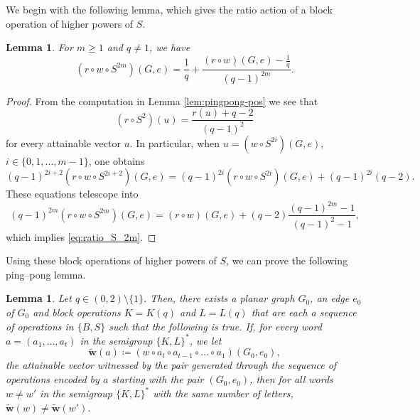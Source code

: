 \documentclass[A4paper,reqno,oneside,12pt]{amsart}
\theoremstyle{plain}
\newtheorem{lemma}[theorem]{Lemma}
\theoremstyle{definition}
\begin{document}
We begin with the following lemma, which gives the ratio action of a block operation of higher powers of $S$.
\begin{lemma}
    \label{lem:S2_powers}
    For $m \geq 1$ and $q \neq 1$, we have 
    \begin{equation}\label{eq:ratio_S_2m}
        (r \circ w \circ S^{2m})(G,e) = \frac{1}{q} + \frac{(r \circ w)(G,e) - \frac{1}{q}}{(q-1)^{2m}}.
    \end{equation}
\end{lemma}
\begin{proof}
    From the computation in Lemma \ref{lem:pingpong-pos} we see that
    \begin{equation*}
        (r\circ S^2)(u)  = 
        \frac{r(u)+ q-2}{(q-1)^2}
        \end{equation*}
for every attainable vector $u$. In particular, when $u = (w \circ S^{2i})(G,e)$, $i \in \{0,1,\dots,m-1\}$, one obtains
\begin{equation*}
        (q-1)^{2i+2}(r\circ w \circ S^{2i+2})(G,e)  = 
        (q-1)^{2i}(r\circ w \circ S^{2i})(G,e)+ (q-1)^{2i}(q-2).
\end{equation*}
These equations telescope into
\begin{equation*}
            (q-1)^{2m}(r\circ w \circ S^{2m})(G,e)  = 
        (r\circ w)(G,e)+ (q-2)\frac{(q-1)^{2m}-1}{(q-1)^2-1},
\end{equation*}
which implies \eqref{eq:ratio_S_2m}.
\end{proof}

Using these block operations of higher powers of $S$, we can prove the following ping--pong lemma. 
\begin{lemma}\label{lem:ping_pong_02} Let $q \in (0,2)\setminus \{1\}$. Then, there exists a planar graph $G_0$, an edge $e_0$ of $G_0$ and block operations $K=K(q)$ and $L=L(q)$ that are each a sequence of operations in $\{B,S\}$ such that the following is true.  If, for every word $a = (a_1,\dots,a_t)$ in the semigroup $\{K,L\}^\ast $, we let 
     \[\widetilde{\mathbf{w}}(a) \coloneqq (w\circ a_t\circ a_{t-1}\circ\dots\circ a_1)(G_0,e_0),\]
     the attainable vector witnessed by the pair generated through the sequence of operations encoded by $a$ starting with the pair $(G_0,e_0)$, then for all words $w\ne w'$ in the semigroup $\{K,L\}^\ast$ with the same number of letters,  $\widetilde{\mathbf{w}}(w)\neq \widetilde{\mathbf{w}}(w')$.
    
\end{lemma}
\end{document}
